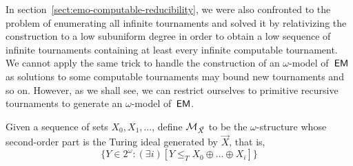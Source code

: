 In section~\ref{sect:emo-computable-reducibility}, we were also confronted to the problem
of enumerating all infinite tournaments
and solved it by relativizing the construction to a low subuniform degree
in order to obtain a low sequence of infinite tournaments containing at least
every infinite computable tournament. We cannot apply the same
trick to handle the construction of an $\omega$-model of~$\operatorname{\sf{EM}}$
as solutions to some computable tournaments may bound new tournaments
and so on. However, as we shall see, we can restrict ourselves
to primitive recursive tournaments to generate an $\omega$-model of~$\operatorname{\sf{EM}}$.

Given a sequence of sets $X_0, X_1, \dots$, define $\mathcal{M}_{\vec{X}}$ to be the $\omega$-structure
whose second-order part is the Turing ideal generated by $\vec{X}$, that is,
$$
\{ Y \in 2^\omega : (\exists i)[ Y \leq_T X_0 \oplus \dots \oplus X_i ]\}
$$

